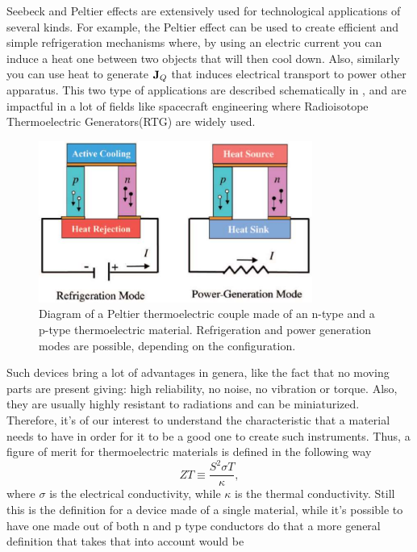Seebeck and Peltier effects are extensively used for technological applications of several kinds. For example, the Peltier effect can be used to create efficient and simple refrigeration mechanisms where, by using an electric current you can induce a heat one between two objects that will then cool down. Also, similarly you can use heat to generate $\vb{J}_Q$ that induces electrical transport to power other apparatus. This two type of applications are described schematically in , and are impactful in a lot of fields like spacecraft engineering where Radioisotope Thermoelectric Generators(RTG) are widely used.
\begin{figure}[t]
    \centering
    \includegraphics[width=0.8\textwidth]{Immagini/ThermoAppl.png}
    \caption
    {
        Diagram of a Peltier thermoelectric couple made of an n-type and a p-type thermoelectric material. Refrigeration and power generation modes are possible, depending on the configuration.
    }
    \label{fig:ThermoAppl}
\end{figure}
Such devices bring a lot of advantages in genera, like the fact that no moving parts are present giving: high reliability, no noise, no vibration or torque. Also, they are usually highly resistant to radiations and can be miniaturized. Therefore, it's of our interest to understand the characteristic that a material needs to have in order for it to be a good one to create such instruments. Thus, a figure of merit for thermoelectric materials is defined in the following way
\begin{equation}
    \label{eq:ZT}
    ZT \equiv \frac{S^2\sigma T}{\kappa},
\end{equation}
where $\sigma$ is the electrical conductivity, while $\kappa$ is the thermal conductivity. Still this is the definition for a device made of a single material, while it's possible to have one made out of both n and p type conductors do that a more general definition that takes that into account would be
